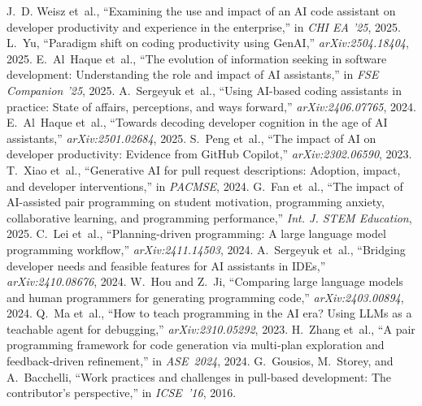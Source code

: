 \documentclass[conference]{IEEEtran}
\begin{document}
\begin{thebibliography}{99}
 J.~D. Weisz et~al., “Examining the use and impact of an AI code assistant on developer productivity and experience in the enterprise,” in \emph{CHI EA ’25}, 2025.
 L.~Yu, “Paradigm shift on coding productivity using GenAI,” \emph{arXiv:2504.18404}, 2025.
 E.~Al~Haque et~al., “The evolution of information seeking in software development: Understanding the role and impact of AI assistants,” in \emph{FSE Companion ’25}, 2025.
 A.~Sergeyuk et~al., “Using AI-based coding assistants in practice: State of affairs, perceptions, and ways forward,” \emph{arXiv:2406.07765}, 2024.
 E.~Al~Haque et~al., “Towards decoding developer cognition in the age of AI assistants,” \emph{arXiv:2501.02684}, 2025.
 S.~Peng et~al., “The impact of AI on developer productivity: Evidence from GitHub Copilot,” \emph{arXiv:2302.06590}, 2023.
 T.~Xiao et~al., “Generative AI for pull request descriptions: Adoption, impact, and developer interventions,” in \emph{PACMSE}, 2024.
 G.~Fan et~al., “The impact of AI-assisted pair programming on student motivation, programming anxiety, collaborative learning, and programming performance,” \emph{Int. J. STEM Education}, 2025.
 C.~Lei et~al., “Planning-driven programming: A large language model programming workflow,” \emph{arXiv:2411.14503}, 2024.
 A.~Sergeyuk et~al., “Bridging developer needs and feasible features for AI assistants in IDEs,” \emph{arXiv:2410.08676}, 2024.
 W.~Hou and Z.~Ji, “Comparing large language models and human programmers for generating programming code,” \emph{arXiv:2403.00894}, 2024.
 Q.~Ma et~al., “How to teach programming in the AI era? Using LLMs as a teachable agent for debugging,” \emph{arXiv:2310.05292}, 2023.
 H.~Zhang et al., “A pair programming framework for code generation via multi‑plan exploration and feedback‑driven refinement,” in \emph{ASE 2024}, 2024.
 G.~Gousios, M.~Storey, and A.~Bacchelli, “Work practices and challenges in pull‑based development: The contributor’s perspective,” in \emph{ICSE ’16}, 2016.
\end{thebibliography}

\appendix
\end{document}
